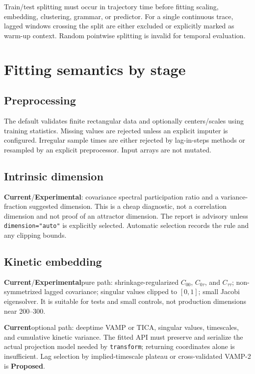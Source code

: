 \documentclass[11pt]{article}
\newcommand{\Current}{\textbf{Current}}
\newcommand{\Proposed}{\textbf{Proposed}}
\newcommand{\Experimental}{\textbf{Experimental}}
\begin{document}
Train/test splitting must occur in trajectory time before fitting scaling,
embedding, clustering, grammar, or predictor. For a single continuous trace,
lagged windows crossing the split are either excluded or explicitly marked as
warm-up context. Random pointwise splitting is invalid for temporal evaluation.

\section{Fitting semantics by stage}

\subsection{Preprocessing}

The default validates finite rectangular data and optionally centers/scales using
training statistics. Missing values are rejected unless an explicit imputer is
configured. Irregular sample times are either rejected by lag-in-steps methods
or resampled by an explicit preprocessor. Input arrays are not mutated.

\subsection{Intrinsic dimension}

\Current/\Experimental: covariance spectral participation ratio and a
variance-fraction suggested dimension. This is a cheap diagnostic, not a
correlation dimension and not proof of an attractor dimension. The report is
advisory unless \texttt{dimension="auto"} is explicitly selected. Automatic
selection records the rule and any clipping bounds.

\subsection{Kinetic embedding}

\Current/\Experimental pure path: shrinkage-regularized $C_{00}$,
$C_{0\tau}$, and $C_{\tau\tau}$; non-symmetrized lagged covariance; singular
values clipped to $[0,1]$; small Jacobi eigensolver. It is suitable for tests and
small controls, not production dimensions near 200--300.

\Current optional path: deeptime VAMP or TICA, singular values, timescales, and
cumulative kinetic variance. The fitted API must preserve and serialize the
actual projection model needed by \texttt{transform}; returning coordinates
alone is insufficient. Lag selection by implied-timescale plateau or
cross-validated VAMP-2 is \Proposed.
\end{document}
